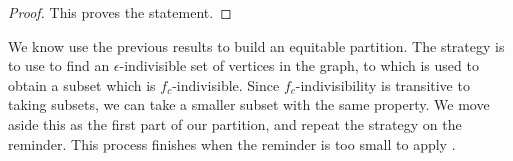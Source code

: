 \begin{lemma}[Claim 4.21]
\begin{proof}
            This proves the statement.
        \end{proof}
    \end{lemma}

    We know use the previous results to build an equitable partition.
    The strategy is to use  to find an $\epsilon$-indivisible set of vertices in
    the graph, to which  is used to obtain
    a subset which is $f_c$-indivisible.
    Since $f_c$-indivisibility is transitive to taking subsets, we can take a smaller subset with the same property.
    We move aside this as the first part of our partition, and repeat the strategy on the reminder.
    This process finishes when the reminder is too small to apply .

